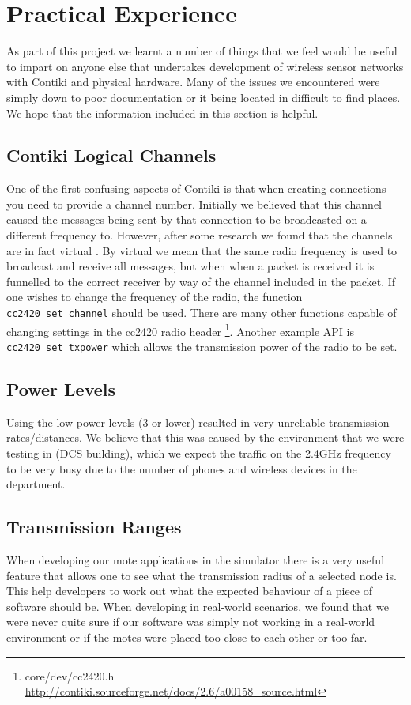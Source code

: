 \section{Practical Experience}

As part of this project we learnt a number of things that we feel would be useful to impart on anyone else that undertakes development of wireless sensor networks with Contiki and physical hardware. Many of the issues we encountered were simply down to poor documentation or it being located in difficult to find places. We hope that the information included in this section is helpful.

\subsection{Contiki Logical Channels}

One of the first confusing aspects of Contiki is that when creating connections you need to provide a channel number. Initially we believed that this channel caused the messages being sent by that connection to be broadcasted on a different frequency to. However, after some research we found that the channels are in fact virtual \cite{Dunkels:2007:ACA:1322263.1322295,tel-aviv-contiki-exercises}. By virtual we mean that the same radio frequency is used to broadcast and receive all messages, but when when a packet is received it is funnelled to the correct receiver by way of the channel included in the packet. If one wishes to change the frequency of the radio, the function \verb|cc2420_set_channel| should be used. There are many other functions capable of changing settings in the cc2420 radio header \footnote{core/dev/cc2420.h \url{http://contiki.sourceforge.net/docs/2.6/a00158_source.html}}. Another example API is \verb|cc2420_set_txpower| which allows the transmission power of the radio to be set.

\subsection{Power Levels}
Using the low power levels (3 or lower) resulted in very unreliable transmission rates/distances. We believe that this was caused by the environment that we were testing in (DCS building), which we expect the traffic on the 2.4GHz frequency to be very busy due to the number of phones and wireless devices in the department.

\subsection{Transmission Ranges}
When developing our mote applications in the simulator there is a very useful feature that allows one to see what the transmission radius of a selected node is. This help developers to work out what the expected behaviour of a piece of software should be. When developing in real-world scenarios, we found that we were never quite sure if our software was simply not working in a real-world environment or if the motes were placed too close to each other or too far.


